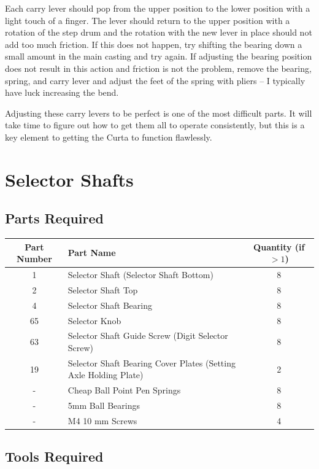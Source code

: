 \documentclass[openany]{book}
\begin{document}
Each carry lever should pop from the upper position to the lower position with a light touch of a finger. The lever should return to the upper position with a rotation of the step drum and the rotation with the new lever in place should not add too much friction. If this does not happen, try shifting the bearing down a small amount in the main casting and try again. If adjusting the bearing position does not result in this action and friction is not the problem, remove the bearing, spring, and carry lever and adjust the feet of the spring with pliers -- I typically have luck increasing the bend.

Adjusting these carry levers to be perfect is one of the most difficult parts. It will take time to figure out how to get them all to operate consistently, but this is a key element to getting the Curta to function flawlessly.



\chapter{Selector Shafts}
\section{Parts Required}
\begin{table}[!ht]
	\centering
	\begin{tabular}{clc}
		Part Number & Part Name & Quantity (if $>1$) \\ \hline
		1 & Selector Shaft (Selector Shaft Bottom) & 8 \\
		2 & Selector Shaft Top & 8 \\
		4 & Selector Shaft Bearing & 8 \\
		65 & Selector Knob & 8 \\
		63 & Selector Shaft Guide Screw (Digit Selector Screw) & 8 \\
		19 & Selector Shaft Bearing Cover Plates (Setting Axle Holding Plate) & 2 \\ \hline \hline 
		- & Cheap Ball Point Pen Springs & 8 \\
		- & 5mm Ball Bearings & 8 \\
		- & M4 10 mm Screws & 4
	\end{tabular}
\end{table}


\section{Tools Required}
\end{document}

